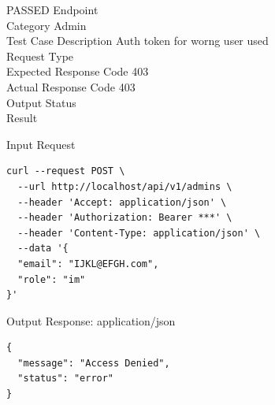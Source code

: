 \begin{testcase}{28}{PASSED}
Endpoint \hfill {}\\
Category \hfill Admin\\
Test Case Description \hfill Auth token for worng user used\\

Request Type    \hfill {}\\
Expected Response Code    \hfill 403\\
Actual Response Code    \hfill 403\\

Output Status \hfill {}\\
Result \hfill {}

\begin{ipblock}{Input Request}
\begin{verbatim}
curl --request POST \
  --url http://localhost/api/v1/admins \
  --header 'Accept: application/json' \
  --header 'Authorization: Bearer ***' \
  --header 'Content-Type: application/json' \
  --data '{
  "email": "IJKL@EFGH.com",
  "role": "im"
}'
\end{verbatim}
\end{ipblock}

\begin{opblock}{Output Response: application/json}
\begin{verbatim}
{
  "message": "Access Denied",
  "status": "error"
}
\end{verbatim}
\end{opblock}
\end{testcase}

